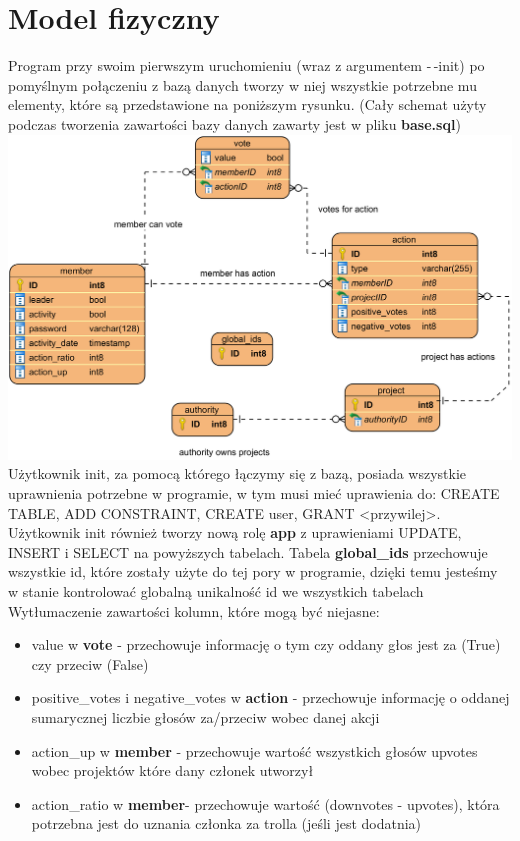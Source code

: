 \documentclass{article}
\begin{document}
\newpage
\section{Model fizyczny}
Program przy swoim pierwszym uruchomieniu (wraz z argumentem -\,-init) po pomyślnym połączeniu z bazą danych
tworzy w niej wszystkie potrzebne mu elementy, które są przedstawione na poniższym rysunku. \newline
(Cały schemat użyty podczas tworzenia zawartości bazy danych zawarty jest w pliku \textbf{base.sql})
\includegraphics[scale=0.303]{base}  \newline
Użytkownik init, za pomocą którego łączymy się z bazą, posiada wszystkie uprawnienia potrzebne w programie, w tym musi mieć uprawienia do: CREATE TABLE, ADD CONSTRAINT, CREATE user, GRANT <przywilej>.
Użytkownik init również tworzy nową rolę \textbf{app} z uprawieniami UPDATE, INSERT i SELECT na powyższych tabelach. \newline  \newline 
Tabela\textbf{ global\_ids} przechowuje wszystkie id, które zostały użyte do tej pory w programie, dzięki temu jesteśmy w stanie kontrolować globalną unikalność id we wszystkich tabelach \newline
Wytłumaczenie zawartości kolumn, które mogą być niejasne:
\begin{itemize}
\item value w \textbf{vote} - przechowuje informację o tym czy oddany głos jest za (True) czy przeciw (False)
\item positive\_votes i negative\_votes w \textbf{action} - przechowuje informację o oddanej sumarycznej liczbie głosów za/przeciw wobec danej akcji
\item action\_up w \textbf{member} - przechowuje wartość wszystkich głosów upvotes wobec projektów które dany członek utworzył
\item action\_ratio w \textbf{member}- przechowuje wartość (downvotes - upvotes), która potrzebna jest do uznania członka za trolla (jeśli jest dodatnia)
\end{itemize}
\end{document}
